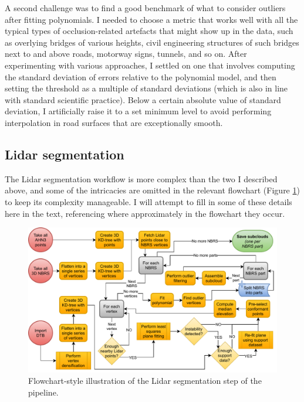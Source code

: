 A second challenge was to find a good benchmark of what to consider outliers after fitting polynomials. I needed to choose a metric that works well with all the typical types of occlusion-related artefacts that might show up in the data, such as overlying bridges of various heights, civil engineering structures of such bridges next to and above roads, motorway signs, tunnels, and so on. After experimenting with various approaches, I settled on one that involves computing the standard deviation of errors relative to the polynomial model, and then setting the threshold as a multiple of standard deviations (which is also in line with standard scientific practice). Below a certain absolute value of standard deviation, I artificially raise it to a set minimum level to avoid performing interpolation in road surfaces that are exceptionally smooth.

\subsection{Lidar segmentation}
\label{sub:m_lidarsegmentation}

The Lidar segmentation workflow is more complex than the two I described above, and some of the intricacies are omitted in the relevant flowchart (Figure \ref{fig:lidarsegmentationflow}) to keep its complexity manageable. I will attempt to fill in some of these details here in the text, referencing where approximately in the flowchart they occur.

\begin{figure}
    \centering
    \includegraphics[width=0.9\linewidth]{final_report/figs/lidar_segmentation.pdf}
    \caption{Flowchart-style illustration of the Lidar segmentation step of the pipeline.}
    \label{fig:lidarsegmentationflow}
\end{figure}

